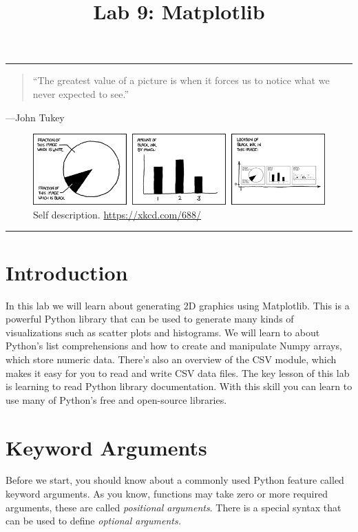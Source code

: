 \documentclass[11pt]{cselabheader}
\title{Lab 9: Matplotlib}
\begin{document}
\maketitle
{}
\hrule

\begin{quote}
``The greatest value of a picture is when it forces us to notice what we
never expected to see.''
\end{quote}
\begin{flushright}
---John Tukey
\end{flushright}

\begin{figure}[H]
  \centering
  \includegraphics[width=\textwidth]{img/xkcd_self_description.png}
  \caption{Self description. \url{https://xkcd.com/688/}}
\end{figure}

\hrule

\pagebreak
\tableofcontents

\section*{Introduction}
In this lab we will learn about generating 2D graphics using
Matplotlib.  This is a powerful Python library that can be used to
generate many kinds of visualizations such as scatter plots and
histograms. We will learn to about Python's list comprehensions and
how to create and manipulate Numpy arrays, which store numeric data.
There's also an overview of the CSV module, which makes it easy for
you to read and write CSV data files.  The key lesson of this lab is
learning to read Python library documentation. With this skill you can
learn to use many of Python's free and open-source libraries.

\pagebreak
{}
\section{Keyword Arguments}
Before we start, you should know about a commonly used Python feature
called keyword arguments. As you know, functions may take zero or more
required arguments, these are called \textsl{positional arguments}.
There is a special syntax that can be used to define \textsl{optional
arguments.}
\end{document}
